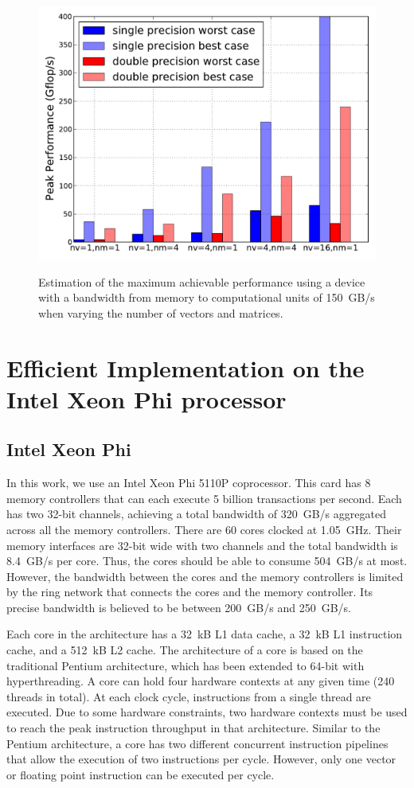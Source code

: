 \documentclass{sig-alternate}
\begin{document}
\begin{figure}[t]
  \centering 
  \includegraphics[width=.9\linewidth]{figures/gflops_peak.pdf}\label{fig:gflops-peak-perf}
  \caption{Estimation of the maximum achievable performance using a
    device with a bandwidth from memory to computational units of 150~GB/s when
    varying the number of vectors and matrices.}
  \label{fig:perf_predict}
\end{figure}

\section{Efficient Implementation on the Intel Xeon Phi processor}
\label{sec:impl}

\subsection{Intel Xeon Phi}

In this work, we use an Intel Xeon Phi 5110P coprocessor. This card
has 8 memory controllers that can each execute 5 billion
transactions per second. Each has two 32-bit channels, achieving a total
bandwidth of 320~GB/s aggregated across all the memory
controllers. There are 60 cores clocked at 1.05~GHz. Their memory
interfaces are 32-bit wide with two channels and the total bandwidth
is 8.4~GB/s per core. Thus, the cores should be able to consume 504~GB/s
at most. However, the bandwidth between the cores and the memory
controllers is limited by the ring network that connects the cores and
the memory controller. Its precise bandwidth is
believed to be between 200~GB/s and 250~GB/s.

Each core in the architecture has a 32~kB L1 data cache, a 32~kB L1
instruction cache, and a 512~kB L2 cache. The architecture of a core is
based on the traditional Pentium architecture, which has been extended to
64-bit with hyperthreading. A core can hold four hardware contexts at any given time (240 threads in total). At each
clock cycle, instructions from a single thread are executed. Due to
some hardware constraints, two hardware contexts must be used to reach
the peak instruction throughput in that architecture. Similar to the
Pentium architecture, a core has two different concurrent instruction
pipelines that allow the execution of two instructions per
cycle. However, only one vector or floating point instruction can be
executed per cycle.
\end{document}
